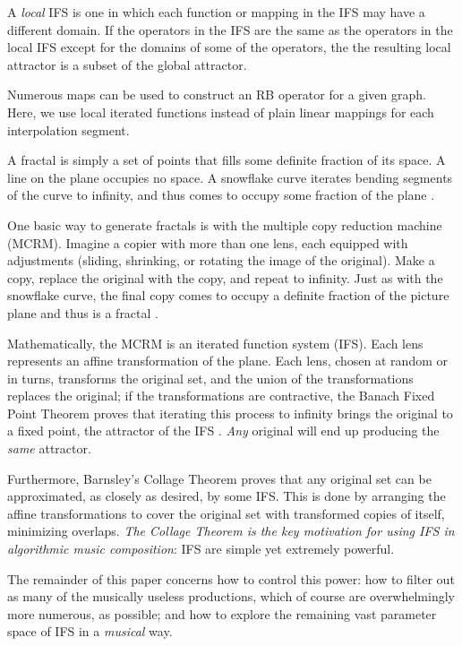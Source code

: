 \documentclass[english,11pt,letterpaper,onecolumn]{scrartcl}
\begin{document}
A \textit{local} IFS is one in which each function or mapping in the IFS may have a different domain. 
If the operators in the IFS are the same as the operators in the local IFS except for the domains 
of some of the operators, the the resulting local attractor is a subset of the global attractor.

Numerous maps can be used to construct an RB operator for a given graph. Here, we use local iterated functions 
instead of plain linear mappings for each interpolation segment.

A fractal is simply a set of points that fills some definite fraction of its 
space. A line on the plane occupies no space. A snowflake curve iterates 
bending segments of the curve to infinity, and thus comes to occupy some 
fraction of the plane \cite{Mandelbrot:1982:FGN}.

One basic way to generate fractals is with the multiple copy reduction 
machine (MCRM). Imagine a copier with more than one lens, each equipped with 
adjustments (sliding, shrinking, or rotating the image of the original). Make 
a copy, replace the original with the copy, and repeat to infinity. Just as 
with the snowflake curve, the final copy comes to occupy a definite fraction 
of the picture plane and thus is a fractal \cite{chaosandfractals}. 

Mathematically, the MCRM is an iterated function system (IFS). Each lens 
represents an affine transformation of the plane. Each lens, chosen at random 
or in turns, transforms the original set, and the union of the transformations  
replaces the original; if the transformations are contractive, 
the Banach Fixed Point Theorem proves that iterating this process to infinity 
brings the original to a fixed point, the attractor of the IFS 
\cite{chaosandfractals, barnsley1985iterated, 10.2307/24893080, 
fractalseverywhere}. \textit{Any} original will end up producing the 
\textit{same} attractor. 

Furthermore, Barnsley's Collage Theorem \cite{barnsley:1986:solution} proves 
that any original set can be approximated, as closely as desired, by some IFS. 
This is done by arranging the affine transformations to cover the original set 
with transformed copies of itself, minimizing overlaps. \textit{The Collage 
Theorem is the key motivation for using IFS in algorithmic music composition}: 
IFS are simple yet extremely powerful. 

The remainder of this paper concerns how to control this power: how to 
filter out as many of the musically useless productions, which of course are 
overwhelmingly more numerous, as possible; and how to explore the 
remaining vast parameter space of IFS in a \textit{musical} way.
\end{document}
